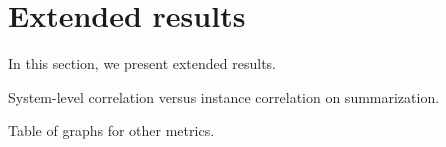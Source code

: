 \section{Extended results}
\label{sec:extended}

In this section, we present extended results.

System-level correlation versus instance correlation on summarization.

Table of graphs for other metrics.

